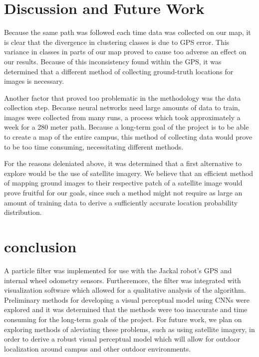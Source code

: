 \documentclass[letterpaper, 12 pt, conference]{ieeeconf}  %
\begin{document}
\section{Discussion and Future Work}

Because the same path was followed each time data was collected on our map, it is clear that the divergence in clustering classes is due to GPS error. This variance in classes in parts of our map proved to cause too adverse an effect on our results. Because of this inconsistency found within the GPS, it was determined that a different method of collecting ground-truth locations for images is necessary. 
\par
Another factor that proved too problematic in the methodology was the data collection step. Because neural networks need large amounts of data to train, images were collected from many runs, a process which took approximately a week for a 280 meter path. Because a long-term goal of the project is to be able to create a map of the entire campus, this method of collecting data would prove to be too time consuming, necessitating different methods. 
\par
For the reasons deleniated above, it was determined that a first alternative to explore would be the use of satellite imagery. We believe that an efficient method of mapping ground images to their respective patch of a satellite image would prove fruitful for our goals, since such a method might not require as large an amount of training data to derive a sufficiently accurate location probability distribution.  

\section{conclusion}

A particle filter was implemented for use with the Jackal robot's GPS and internal wheel odometry sensors. Furtheremore, the filter was integrated with visualization software which allowed for a qualitative analysis of the algorithm. Preliminary methods for developing a visual perceptual model using CNNs were explored and it was determined that the methods were too inaccurate and time consuming for the long-term goals of the project. For future work, we plan on exploring methods of aleviating these problems, such as using satellite imagery, in order to derive a robust visual perceptual model which will allow for outdoor localization around campus and other outdoor environments. 



\end{document}
